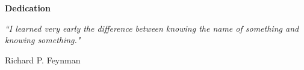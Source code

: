 
\newpage
\vspace*{0.9cm}
\begin{center}
{\bf \Huge Dedication}
\end{center}

\setlength{\baselineskip}{0.8cm}



 \null\vfill %

\textit{``I learned very early the difference between knowing the name of something and knowing something."}

\begin{flushright}
Richard P. Feynman
\end{flushright}

 \vfill\vfill\vfill\vfill\vfill\vfill\null %
